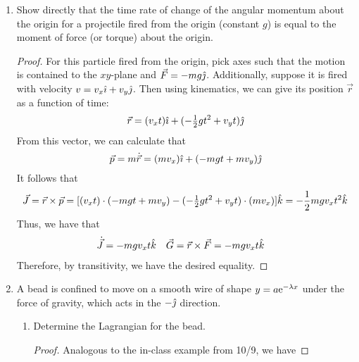 \documentclass[../psets.tex]{subfiles}
\begin{document}
\begin{enumerate}
\begin{proof}
\begin{align*}
            x_h &= \pm\frac{v_0}{2g}\sqrt{v_0^2-4gh}
        \end{align*}
        It follows that
        \begin{equation*}
            d = 2x_h = \frac{v_0}{g}\sqrt{v_0^2-4gh}
        \end{equation*}
        as desired.
    \end{proof}
    \item Show directly that the time rate of change of the angular momentum about the origin for a projectile fired from the origin (constant $g$) is equal to the moment of force (or torque) about the origin.
    \begin{proof}
        For this particle fired from the origin, pick axes such that the motion is contained to the $xy$-plane and $\vec{F}=-mg\jhat$. Additionally, suppose it is fired with velocity $v=v_x\ihat+v_y\jhat$. Then using kinematics, we can give its position $\vec{r}$ as a function of time:
        \begin{equation*}
            \vec{r} = (v_xt)\ihat+(-\tfrac{1}{2}gt^2+v_yt)\jhat
        \end{equation*}
        From this vector, we can calculate that
        \begin{equation*}
            \vec{p} = m\dot{\vec{r}}
            = (mv_x)\ihat+(-mgt+mv_y)\jhat
        \end{equation*}
        It follows that
        \begin{equation*}
            \vec{J} = \vec{r}\times\vec{p}
            = [(v_xt)\cdot(-mgt+mv_y)-(-\tfrac{1}{2}gt^2+v_yt)\cdot(mv_x)]\khat
            = -\frac{1}{2}mgv_xt^2\khat
        \end{equation*}
        Thus, we have that
        \begin{align*}
            \dot{\vec{J}} &= -mgv_xt\khat&
            \vec{G} &= \vec{r}\times\vec{F}
                = -mgv_xt\khat
        \end{align*}
        Therefore, by transitivity, we have the desired equality.
    \end{proof}
    \item A bead is confined to move on a smooth wire of shape $y=a\e[-\lambda x]$ under the force of gravity, which acts in the $-\jhat$ direction.
    \begin{enumerate}
        \item Determine the Lagrangian for the bead.
        \begin{proof}
            Analogous to the in-class example from 10/9, we have

\end{proof}
\end{enumerate}
\end{enumerate}
\end{document}
